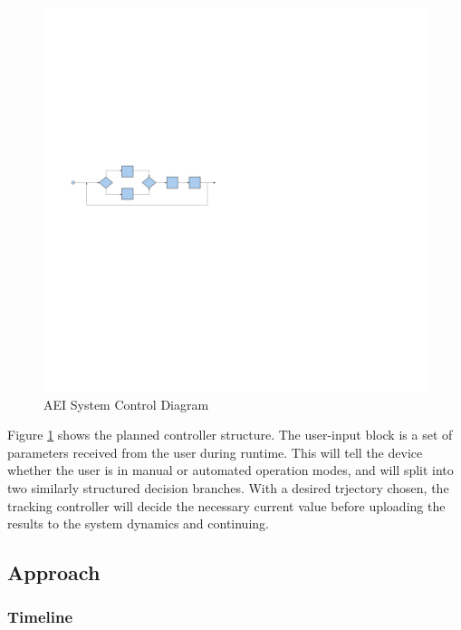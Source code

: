 	\begin{figure}[ht]
		\centering
		\includegraphics[scale=0.30]{control_diagram}
		\caption{AEI System Control Diagram}
		\label{fig:control_diagram}
	\end{figure}

	Figure \ref{fig:control_diagram} shows the planned controller structure. The user-input block is a set of parameters received from the user during runtime. This will tell the device whether the user is in manual or automated operation modes, and will split into two similarly structured decision branches. With a desired trjectory chosen, the tracking controller will decide the necessary current value before uploading the results to the system dynamics and continuing.

\subsection{Approach}

	\subsubsection{Timeline}


